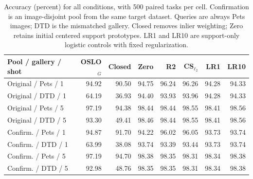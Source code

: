 \begin{table}[t]
\centering\small\setlength{\tabcolsep}{3pt}
\begin{tabular}{lrrrrrrr}
\toprule
Pool / gallery / shot & OSLO$_G$ & Closed & Zero & R2 & CS$_{\ell_2}$ & LR1 & LR10 \\ \midrule
Original / Pets / 1 & 94.92 & 90.50 & 94.75 & 96.24 & 96.26 & 94.28 & 94.33 \\
Original / DTD / 1 & 64.19 & 36.93 & 94.40 & 93.93 & 93.96 & 94.28 & 94.33 \\
Original / Pets / 5 & 97.19 & 94.38 & 98.44 & 98.44 & 98.55 & 98.41 & 98.56 \\
Original / DTD / 5 & 93.30 & 49.41 & 98.46 & 98.44 & 98.55 & 98.41 & 98.56 \\
Confirm. / Pets / 1 & 94.87 & 91.70 & 94.22 & 96.02 & 96.05 & 93.73 & 93.74 \\
Confirm. / DTD / 1 & 63.99 & 38.08 & 93.74 & 93.39 & 93.44 & 93.73 & 93.74 \\
Confirm. / Pets / 5 & 97.19 & 94.70 & 98.38 & 98.35 & 98.31 & 98.34 & 98.38 \\
Confirm. / DTD / 5 & 92.98 & 48.76 & 98.35 & 98.35 & 98.31 & 98.34 & 98.38 \\
\bottomrule\end{tabular}
\caption{Accuracy (percent) for all conditions, with 500 paired tasks per cell. Confirmation is an image-disjoint pool from the same target dataset. Queries are always Pets images; DTD is the mismatched gallery. Closed removes inlier weighting; Zero retains initial centered support prototypes. LR1 and LR10 are support-only logistic controls with fixed regularization.}\label{tab:performance}
\end{table}
